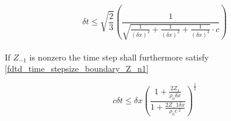 \begin{equation}\label{fdtd_time_stepsize_boundary}
\delta t \leq \sqrt{\frac{2}{3}}  \left( \frac{1}{\sqrt{\frac{1}{(\delta x)^2}+\frac{1}{(\delta x)^2}+\frac{1}{(\delta x)^2} }\cdot c} \right)
\end{equation}\\


If $Z_{-1}$ is nonzero the time step shall furthermore satisfy \autoref{fdtd_time_stepsize_boundary_Z_n1}

\begin{equation}\label{fdtd_time_stepsize_boundary_Z_n1}
c \delta t \leq \delta x \left(   \frac{1+\frac{2Z_1}{\rho_0 \delta x}}{1+\frac{2Z_-1 \delta x}{\rho_0 c~^2}}  \right)^{\frac{1}{2}}
\end{equation}